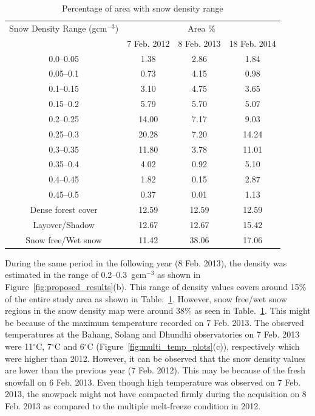 \begin{table}[!htbp]
	\caption{Percentage of area with snow density range}
	\begin{center}
		\begin{tabular}{|c|c|c|c|} \hline
			Snow Density Range (gcm$^{-3}$) & \multicolumn{3}{c|}{Area $\%$} \\
			\cline{2-4}
			& 7 Feb. 2012 & 8 Feb. 2013 & 18 Feb. 2014 \\ \hline
			0.0--0.05 &	1.38 &	2.86 &	1.84 \\ \hline
			0.05--0.1 &	0.73 &	4.15 &	0.98 \\ \hline
			0.1--0.15 &	3.10 &	4.75 &	3.65 \\ \hline
			0.15--0.2 &	5.79 &	5.70 &	5.07  \\ \hline
			0.2--0.25 &	14.00 &	7.17 &	9.03 \\ \hline
			0.25--0.3 &	20.28 &	7.20 &	14.24 \\ \hline
			0.3--0.35 &	11.80 &	3.78 &	11.01 \\ \hline
			0.35--0.4 &	4.02 &	0.92 &	5.10 \\ \hline
			0.4--0.45 &	1.82 &	0.15 &	2.87 \\ \hline
			0.45--0.5 &	0.37 &	0.01 &	1.13 \\ \hline
			\hline		
			Dense forest cover &	12.59 &	12.59 &	12.59 \\ \hline
			Layover/Shadow &	12.67 &	12.67 &	15.42 \\ \hline
			Snow free/Wet snow &	11.42 &	38.06 &	17.06 \\ \hline
		\end{tabular}
	\end{center}
	\label{table:snow_density_range}
\end{table}


During the same period in the following year (8 Feb. 2013), the density was estimated in the range of 0.2--0.3~gcm$^{-3}$ as shown in Figure~\ref{fig:proposed_results}(b). This range of density values covers around 15$\%$ of the entire study area as shown in Table.~\ref{table:snow_density_range}. However, snow free/wet snow regions in the snow density map were around 38$\%$ as seen in Table.~\ref{table:snow_density_range}. This might be because of the maximum temperature recorded on 7 Feb. 2013. The observed temperatures at the Bahang, Solang and Dhundhi observatories on 7 Feb. 2013 were 11$^\circ$C, 7$^\circ$C and 6$^\circ$C (Figure~\ref{fig:multi_temp_plots}(c)), respectively which were higher than 2012. However, it can be observed that the snow density values are lower than the previous year (7 Feb. 2012). This may be because of the fresh snowfall on 6 Feb. 2013. Even though high temperature was observed on 7 Feb. 2013, the snowpack might not have compacted firmly during the acquisition on 8 Feb. 2013 as compared to the multiple melt-freeze condition in 2012. 

